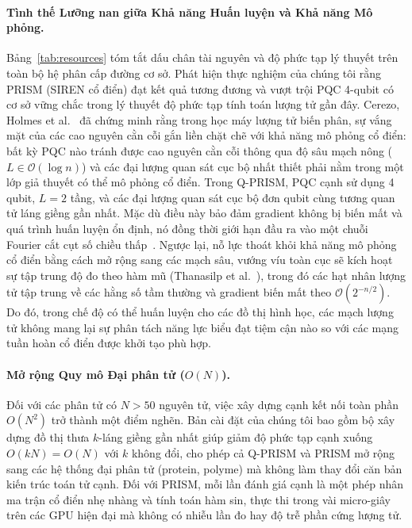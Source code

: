 \documentclass[10pt,twocolumn,letterpaper]{article}
\begin{document}
\paragraph{Tình thế Lưỡng nan giữa Khả năng Huấn luyện và Khả năng Mô phỏng.}
Bảng~\ref{tab:resources} tóm tắt dấu chân tài nguyên và độ phức tạp lý thuyết trên toàn bộ hệ phân cấp đường cơ sở.
Phát hiện thực nghiệm của chúng tôi rằng PRISM (SIREN cổ điển) đạt kết quả tương đương và vượt trội PQC 4-qubit có cơ sở vững chắc trong lý thuyết độ phức tạp tính toán lượng tử gần đây.
Cerezo, Holmes et al.~\cite{Cerezo:2023nqf} đã chứng minh rằng trong học máy lượng tử biến phân, sự vắng mặt của các cao nguyên cằn cỗi gắn liền chặt chẽ với khả năng mô phỏng cổ điển: bất kỳ PQC nào tránh được cao nguyên cằn cỗi thông qua độ sâu mạch nông ($L \in \mathcal{O}(\log n)$) và các đại lượng quan sát cục bộ nhất thiết phải nằm trong một lớp giả thuyết có thể mô phỏng cổ điển.
Trong Q-PRISM, PQC cạnh sử dụng 4 qubit, $L = 2$ tầng, và các đại lượng quan sát cục bộ đơn qubit cùng tương quan tử láng giềng gần nhất.
Mặc dù điều này bảo đảm gradient không bị biến mất và quá trình huấn luyện ổn định, nó đồng thời giới hạn đầu ra vào một chuỗi Fourier cắt cụt số chiều thấp~\cite{landman2023approximating, Schuld:2020enb}.
Ngược lại, nỗ lực thoát khỏi khả năng mô phỏng cổ điển bằng cách mở rộng sang các mạch sâu, vướng víu toàn cục sẽ kích hoạt sự tập trung độ đo theo hàm mũ (Thanasilp et al.~\cite{Thanasilp:2022agd}), trong đó các hạt nhân lượng tử tập trung về các hằng số tầm thường và gradient biến mất theo $\mathcal{O}(2^{-n/2})$.
Do đó, trong chế độ có thể huấn luyện cho các đồ thị hình học, các mạch lượng tử không mang lại sự phân tách năng lực biểu đạt tiệm cận nào so với các mạng tuần hoàn cổ điển được khởi tạo phù hợp.

\paragraph{Mở rộng Quy mô Đại phân tử ($O(N)$).}
Đối với các phân tử có $N > 50$ nguyên tử, việc xây dựng cạnh kết nối toàn phần $O(N^2)$ trở thành một điểm nghẽn. Bản cài đặt của chúng tôi bao gồm bộ xây dựng đồ thị thưa $k$-láng giềng gần nhất giúp giảm độ phức tạp cạnh xuống $O(kN) = O(N)$ với $k$ không đổi, cho phép cả Q-PRISM và PRISM mở rộng sang các hệ thống đại phân tử (protein, polyme) mà không làm thay đổi căn bản kiến trúc toán tử cạnh.
Đối với PRISM, mỗi lần đánh giá cạnh là một phép nhân ma trận cổ điển nhẹ nhàng và tính toán hàm sin, thực thi trong vài micro-giây trên các GPU hiện đại mà không có nhiễu lần đo hay độ trễ phần cứng lượng tử.
\end{document}
